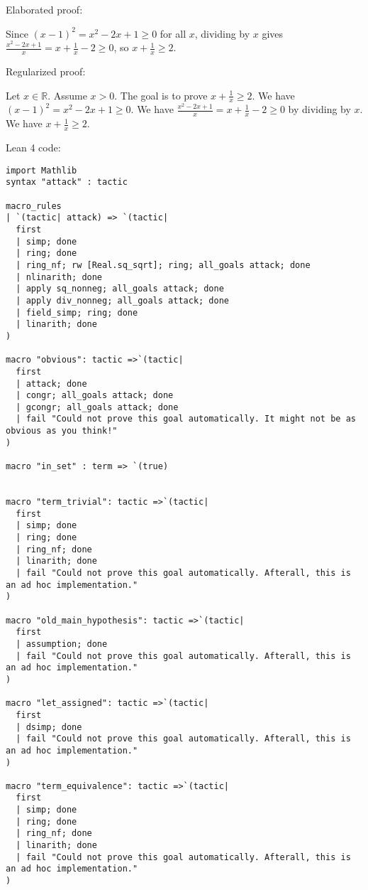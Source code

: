 \documentclass{article}
\begin{document}
Elaborated proof:
\begin{tcolorbox}[colback=green!10, width=\linewidth]
Since $(x-1)^2 = x^2 - 2x + 1 \ge 0$ for all $x$, dividing by $x$ gives $\frac{x^2 - 2x + 1}{x} = x + \frac{1}{x} - 2 \ge 0$, so $x + \frac{1}{x} \ge 2$.
\end{tcolorbox}

Regularized proof:
\begin{tcolorbox}[colback=red!10, width=\linewidth]
Let $x\in\mathbb{R}$. Assume $x>0$.
The goal is to prove $x + \frac{1}{x} \ge 2$.
We have ${\left(x-1\right)}^2 = x^2 - 2x + 1 \ge 0$.
We have $\frac{x^2 - 2x + 1}{x} = x + \frac{1}{x} - 2 \ge 0$ by dividing by $x$.
We have $x + \frac{1}{x} \ge 2$.
\end{tcolorbox}

Lean 4 code:
\begin{tcolorbox}[colback=white!10, width=\linewidth]
\begin{lstlisting}[language=Lean4]
import Mathlib
syntax "attack" : tactic

macro_rules
| `(tactic| attack) => `(tactic|
  first
  | simp; done
  | ring; done
  | ring_nf; rw [Real.sq_sqrt]; ring; all_goals attack; done
  | nlinarith; done
  | apply sq_nonneg; all_goals attack; done
  | apply div_nonneg; all_goals attack; done
  | field_simp; ring; done
  | linarith; done
)

macro "obvious": tactic =>`(tactic|
  first
  | attack; done
  | congr; all_goals attack; done
  | gcongr; all_goals attack; done
  | fail "Could not prove this goal automatically. It might not be as obvious as you think!"
)

macro "in_set" : term => `(true)


macro "term_trivial": tactic =>`(tactic|
  first
  | simp; done
  | ring; done
  | ring_nf; done
  | linarith; done
  | fail "Could not prove this goal automatically. Afterall, this is an ad hoc implementation."
)

macro "old_main_hypothesis": tactic =>`(tactic|
  first
  | assumption; done
  | fail "Could not prove this goal automatically. Afterall, this is an ad hoc implementation."
)

macro "let_assigned": tactic =>`(tactic|
  first
  | dsimp; done
  | fail "Could not prove this goal automatically. Afterall, this is an ad hoc implementation."
)

macro "term_equivalence": tactic =>`(tactic|
  first
  | simp; done
  | ring; done
  | ring_nf; done
  | linarith; done
  | fail "Could not prove this goal automatically. Afterall, this is an ad hoc implementation."
)


\end{lstlisting}
\end{tcolorbox}
\end{document}
